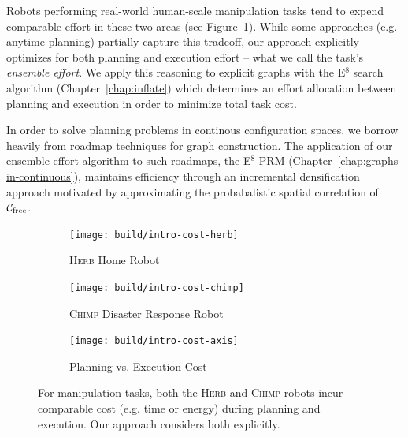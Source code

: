 Robots performing real-world human-scale manipulation tasks
tend to expend comparable effort in these two areas
(see Figure~\ref{fig:plan-exec-cost}).
While some approaches (e.g. anytime planning) partially capture
this tradeoff,
our approach explicitly optimizes for both planning
and execution effort
-- what we call the task's \emph{ensemble effort}.
We apply this reasoning to explicit graphs
with the E$^8$ search algorithm (Chapter~\ref{chap:inflate})
which determines an effort allocation between planning and execution
in order to minimize total task cost.

In order to solve planning problems in continous configuration spaces,
we borrow heavily from roadmap techniques for graph construction.
The application of our ensemble effort algorithm to such roadmaps,
the E$^8$-PRM (Chapter~\ref{chap:graphs-in-continuous}),
maintains efficiency through an
incremental densification approach
motivated by approximating the probabalistic spatial correlation of
$\mathcal{C}_{\mbox{\scriptsize free}}$.

{
\setlength{\offsetpage}{0.5in}
\begin{figure}[t]
\begin{widepage}
\begin{center}
   \begin{subfigure}[b]{1.4in}
      \begin{center}
      \texttt{[image: build/intro-cost-herb]}
      \end{center}
      \caption{\textsc{Herb} Home Robot}
   \end{subfigure}%
   \quad%
   \begin{subfigure}[b]{2.0in}
      \begin{center}
      \texttt{[image: build/intro-cost-chimp]}
      \end{center}
      \caption{\textsc{Chimp} Disaster Response Robot}
   \end{subfigure}%
   \quad%
   \begin{subfigure}[b]{2.0in}
      \begin{center}
      \texttt{[image: build/intro-cost-axis]}
      \end{center}
      \caption{Planning vs. Execution Cost}
   \end{subfigure}
   \caption{For manipulation tasks,
      both the \textsc{Herb} \cite{srinivasa2012herb20}
      and \textsc{Chimp} \cite{stentz2014chimp} robots
      incur comparable cost (e.g. time or energy)
      during planning and execution.
      Our approach considers both explicitly.}
   \label{fig:plan-exec-cost}
\end{center}
\end{widepage}
\end{figure}
}

